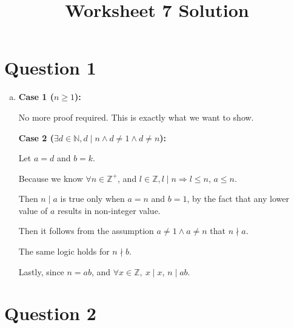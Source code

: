 \documentclass[12pt]{article}
\begin{document}
\title{Worksheet 7 Solution}
\maketitle

\section*{Question 1}
\begin{enumerate}[a.]
    \item

    \textbf{Case 1 ($n \geq 1$):}

    \bigskip

    No more proof required. This is exactly what we want to show.

    \bigskip

    \textbf{Case 2 ($\exists d \in \mathbb{N}, d \mid n \land d \neq 1 \land d \neq n$):}

    \bigskip

    Let $a = d$ and $b = k$.

    \bigskip

    Because we know $\forall n \in \mathbb{Z}^{+}$, and $l \in \mathbb{Z}, l \mid
    n \Rightarrow l \leq n$, $a \leq n$.

    \bigskip

    Then $n \mid a$ is true only when $a = n$ and $b = 1$, by the fact that any
    lower value of $a$ results in non-integer value.

    \bigskip

    Then it follows from the assumption $a \neq 1 \land a \neq n$ that $n \nmid a$.

    \bigskip

    The same logic holds for $n \nmid b$.

    \bigskip

    Lastly, since $n = ab$, and $\forall x \in \mathbb{Z},\:x \mid x$, $n \mid ab$.


\end{enumerate}

\section*{Question 2}
\end{document}
